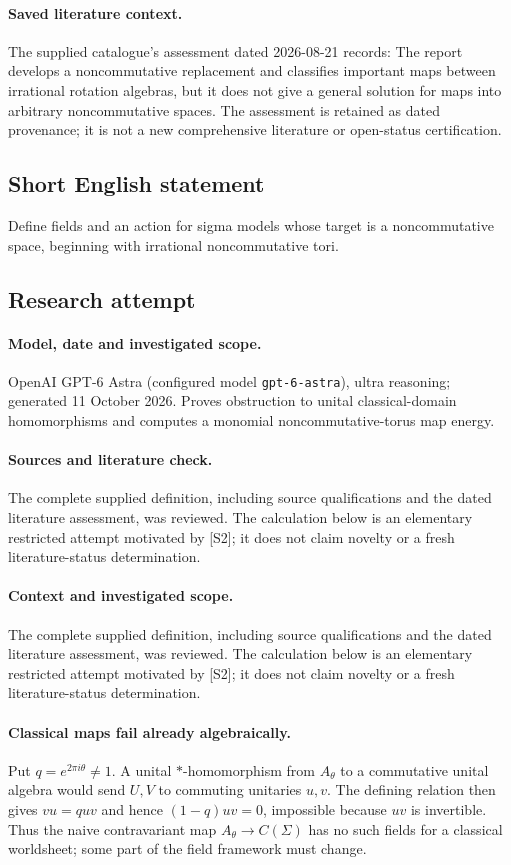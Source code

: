 \documentclass[11pt]{article}
\begin{document}
\paragraph{Saved literature context.} The supplied catalogue's assessment dated 2026-08-21 records: The report develops a noncommutative replacement and classifies important maps between irrational rotation algebras, but it does not give a general solution for maps into arbitrary noncommutative spaces. The assessment is retained as dated provenance; it is not a new comprehensive literature or open-status certification.
\subsection{Short English statement}
Define fields and an action for sigma models whose target is a noncommutative space, beginning with irrational noncommutative tori.
\subsection{Research attempt}
\paragraph{Model, date and investigated scope.}
OpenAI GPT-6 Astra (configured model \texttt{gpt-6-astra}), ultra reasoning; generated 11 October 2026. Proves obstruction to unital classical-domain homomorphisms and computes a monomial noncommutative-torus map energy.

\paragraph{Sources and literature check.}
The complete supplied definition, including source qualifications and the dated literature assessment, was reviewed. The calculation below is an elementary restricted attempt motivated by [S2]; it does not claim novelty or a fresh literature-status determination.

\paragraph{Context and investigated scope.} The complete supplied definition, including source qualifications and the dated literature assessment, was reviewed. The calculation below is an elementary restricted attempt motivated by [S2]; it does not claim novelty or a fresh literature-status determination.

\paragraph{Classical maps fail already algebraically.} Put $q=e^{2\pi i\theta}\ne1$. A unital $*$-homomorphism from $A_\theta$ to a commutative unital algebra would send $U,V$ to commuting unitaries $u,v$. The defining relation then gives $vu=quv$ and hence $(1-q)uv=0$, impossible because $uv$ is invertible. Thus the naive contravariant map $A_\theta\to C(\Sigma)$ has no such fields for a classical worldsheet; some part of the field framework must change.
\end{document}
